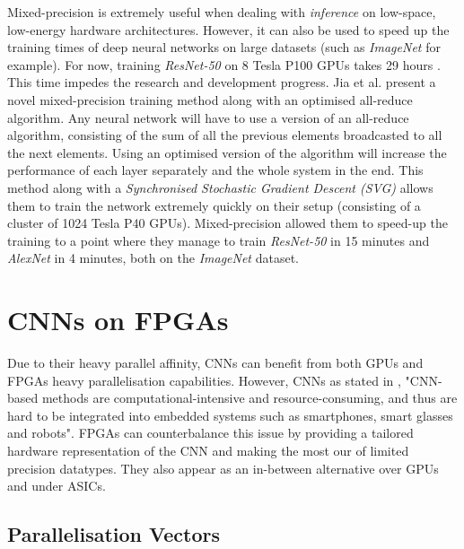 Mixed-precision is extremely useful when dealing with \emph{inference} on low-space, low-energy hardware architectures. However, it can also be used to speed up the training times of deep neural networks on large datasets (such as \emph{ImageNet} for example). For now, training \emph{ResNet-50} on 8 Tesla P100 GPUs takes 29 hours \cite{He2016}. This time  impedes the research and development progress. Jia et al. \cite{Jia2018} present a novel mixed-precision training method along with an optimised all-reduce algorithm. Any neural network will have to use a version of an all-reduce algorithm, consisting of the sum of all the previous elements broadcasted to all the next elements. Using an optimised version of the algorithm will increase the performance of each layer separately and the whole system in the end. This method along with a \emph{Synchronised Stochastic Gradient Descent (SVG)} allows them to train the network extremely quickly on their setup (consisting of a cluster of 1024 Tesla P40 GPUs). Mixed-precision allowed them to speed-up the training to a point where they manage to train \emph{ResNet-50} in 15 minutes and \emph{AlexNet} in 4 minutes, both on the \emph{ImageNet} dataset.



\section{CNNs on FPGAs}

Due to their heavy parallel affinity, CNNs can benefit from both GPUs \cite{Micikevicius2017, Jia2018, Kurth2018} and FPGAs \cite{Park2016, Liang2017, Colangelo2018, Jahanshahi2019, Bacchus2020} heavy parallelisation capabilities.
However, CNNs as stated in \cite{Jahanshahi2019}, "CNN-based methods are computational-intensive and resource-consuming, and thus are hard to be integrated into embedded systems such as smartphones, smart glasses and robots". FPGAs can counterbalance this issue by providing a tailored hardware representation of the CNN and making the most our of limited precision datatypes. They also appear as an in-between alternative over GPUs and under ASICs.


\subsection{Parallelisation Vectors}


